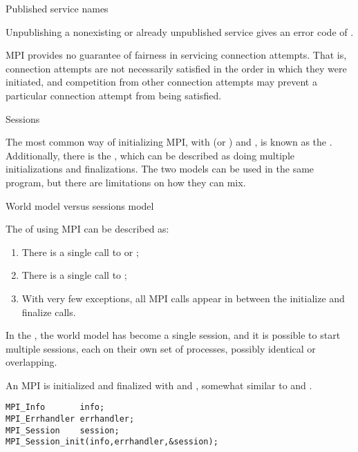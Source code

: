  {Published service names}
\label{sec:mpi-publish}



Unpublishing a nonexisting or already unpublished service gives an
error code of .


MPI provides no guarantee of fairness in servicing connection
attempts. That is, connection attempts are not necessarily satisfied
in the order in which they were initiated, and competition from other
connection attempts may prevent a particular connection attempt from
being satisfied.

\begin{mpifour}
 {Sessions}
\label{sec:session}

The most common way of initializing MPI,
with  (or ) and ,
is known as the .
Additionally, there is the ,
which can be described as doing multiple initializations and finalizations.
The two models can be used in the same program, but there are limitations
on how they can mix.

 {World model versus sessions model}

The  of using MPI can be described as:
\begin{enumerate}
\item There is a single call to  or ;
\item There is a single call to ;
\item With very few exceptions, all MPI calls appear in between the initialize and finalize calls.
\end{enumerate}

In the , the world model has become a single session,
and it is possible to start multiple sessions, each on their own set of processes,
possibly identical or overlapping.

An MPI  is initialized and finalized
with  and ,
somewhat similar to  and .

\begin{lstlisting}
MPI_Info       info;
MPI_Errhandler errhandler;
MPI_Session    session;
MPI_Session_init(info,errhandler,&session);


\end{lstlisting}
\end{mpifour}
